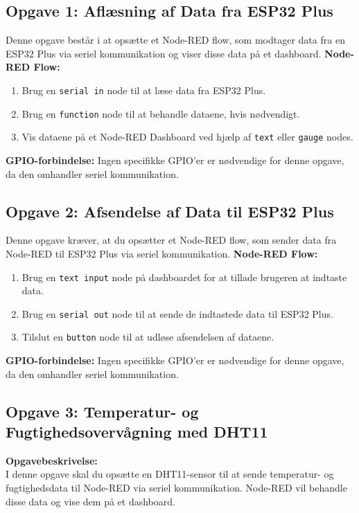 \subsection{Opgave 1: Aflæsning af Data fra ESP32 Plus}
Denne opgave består i at opsætte et Node-RED flow, som modtager data fra en ESP32 Plus via seriel kommunikation og viser disse data på et dashboard.
\newline\newline\noindent
\textbf{Node-RED Flow:}
\begin{enumerate}
	\item Brug en \texttt{serial in} node til at læse data fra ESP32 Plus.
	\item Brug en \texttt{function} node til at behandle dataene, hvis nødvendigt.
	\item Vis dataene på et Node-RED Dashboard ved hjælp af \texttt{text} eller \texttt{gauge} nodes.
\end{enumerate}
\textbf{GPIO-forbindelse:} Ingen specifikke GPIO'er er nødvendige for denne opgave, da den omhandler seriel kommunikation.

\subsection{Opgave 2: Afsendelse af Data til ESP32 Plus}
Denne opgave kræver, at du opsætter et Node-RED flow, som sender data fra Node-RED til ESP32 Plus via seriel kommunikation.
\newline\newline\noindent
\textbf{Node-RED Flow:}
\begin{enumerate}
	\item Brug en \texttt{text input} node på dashboardet for at tillade brugeren at indtaste data.
	\item Brug en \texttt{serial out} node til at sende de indtastede data til ESP32 Plus.
	\item Tilslut en \texttt{button} node til at udløse afsendelsen af dataene.
\end{enumerate}
\textbf{GPIO-forbindelse:} Ingen specifikke GPIO'er er nødvendige for denne opgave, da den omhandler seriel kommunikation.

\subsection{Opgave 3: Temperatur- og Fugtighedsovervågning med DHT11}
\textbf{Opgavebeskrivelse:} \\
I denne opgave skal du opsætte en DHT11-sensor til at sende temperatur- og fugtighedsdata til Node-RED via seriel kommunikation. Node-RED vil behandle disse data og vise dem på et dashboard.
